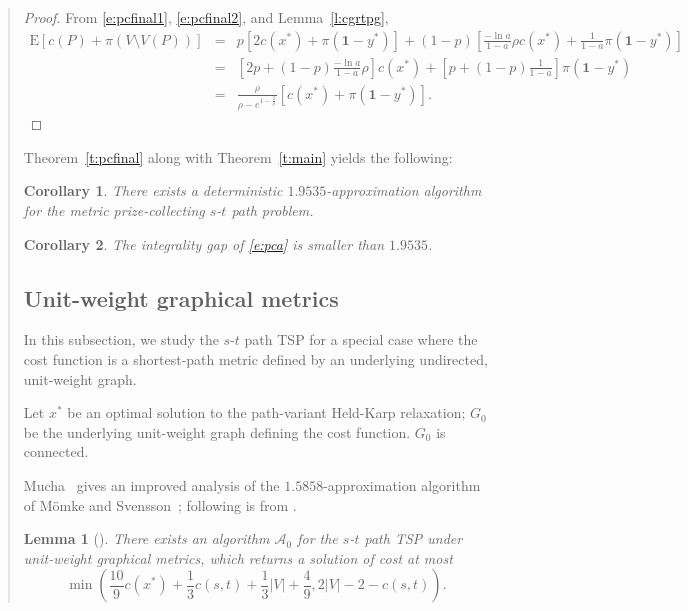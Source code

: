 \documentclass[11pt,letterpaper]{article}
\newtheorem{lemma}{Lemma}
\newtheorem{cor}{Corollary}
\newcommand{\E}{\mathrm{E}}
\newcommand{\st}{\mbox{$s$-$t$} }
\begin{document}
\begin{quote}
\begin{proof}
From \eqref{e:pcfinal1}, \eqref{e:pcfinal2}, and Lemma~\ref{l:cgrtpg},\begin{eqnarray*}
\E[c(P)+\pi(V\setminus V(P))] &=& p \left[ 2c(x^*)+\pi(\mathbf{1}-y^*) \right] + (1-p) \left[ \frac{-\ln a}{1-a}\rho c(x^*) + \frac{1}{1-a}\pi(\mathbf{1}-y^*) \right]\\
&=& \left[2p+(1-p)\frac{-\ln a}{1-a}\rho\right] c(x^*) + \left[p+ (1-p)\frac{1}{1-a} \right] \pi(\mathbf{1}-y^*)\\
&=& \frac{\rho}{\rho-e^{1-\frac{2}{\rho}}}\left[ c(x^*)+\pi(\mathbf{1}-y^*) \right]
.\end{eqnarray*}
\end{proof}

Theorem~\ref{t:pcfinal} along with Theorem~\ref{t:main} yields the following:
\begin{cor}
There exists a deterministic $1.9535$-approximation algorithm for the metric prize-collecting \st path problem.
\end{cor}

\begin{cor}
The integrality gap of \eqref{e:pca} is smaller than $1.9535$.
\end{cor}

\subsection{Unit-weight graphical metrics}\label{ss:unit}

In this subsection, we study the \st path TSP for a special case where the cost function is a shortest-path metric defined by an underlying undirected, unit-weight graph.

Let $x^*$ be an optimal solution to the path-variant Held-Karp relaxation; $G_0$ be the underlying unit-weight graph defining the cost function. $G_0$ is connected.

Mucha~\cite{M} gives an improved analysis of the $1.5858$-approximation algorithm of M\"omke and Svensson~\cite{MS}; following is from \cite{M}.

\begin{lemma}[\cite{M}]\label{l:m}
There exists an algorithm $\mathscr{A}_{0}$ for the \st path TSP under unit-weight graphical metrics, which returns a solution of cost at most\[
\min\left(\frac{10}{9}c(x^*)+\frac{1}{3}c(s,t)+\frac{1}{3}|V|+\frac{4}{9} , 2|V|-2-c(s,t) \right)
.\]
\end{lemma}


\end{quote}
\end{document}

